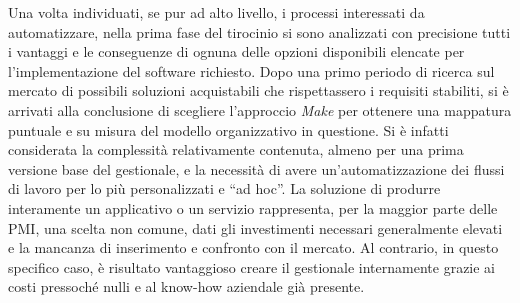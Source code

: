 \newline
\noindent
Una volta individuati, se pur ad alto livello, i processi interessati da automatizzare, nella prima fase del tirocinio si sono analizzati con precisione tutti i vantaggi e le conseguenze di ognuna delle opzioni disponibili elencate per l'implementazione del software richiesto. Dopo una primo periodo di ricerca sul mercato di possibili soluzioni acquistabili che rispettassero i requisiti stabiliti, si è arrivati alla conclusione di scegliere l'approccio \textit{Make} per ottenere una mappatura puntuale e su misura del modello organizzativo in questione. Si è infatti considerata la complessità relativamente contenuta, almeno per una prima versione base del gestionale, e la necessità di avere un'automatizzazione dei flussi di lavoro per lo più personalizzati e ``ad hoc''. La soluzione di produrre interamente un applicativo o un servizio rappresenta, per la maggior parte delle PMI, una scelta non comune, dati gli investimenti necessari generalmente elevati e la mancanza di inserimento e confronto con il mercato. Al contrario, in questo specifico caso, è risultato vantaggioso creare il gestionale internamente grazie ai costi pressoché nulli e al know-how aziendale già presente.              
\clearpage
\newpage